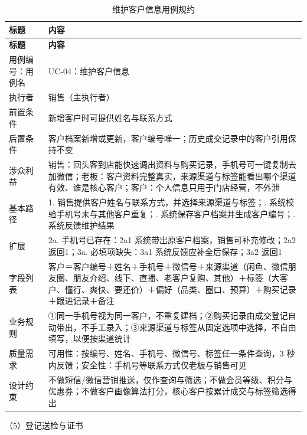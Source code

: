 {\small
\begin{longtable}{@{}L{3.0cm} L{12.3cm}@{}}
\caption{维护客户信息用例规约}\label{tab:uc-04}\\
\toprule
\textbf{标题} & \textbf{内容} \\
\midrule
\endfirsthead
\toprule
\textbf{标题} & \textbf{内容} \\
\midrule
\endhead
用例编号：用例名 & UC-04：维护客户信息 \\
\midrule
执行者 & 销售（主执行者） \\
\midrule
前置条件 & 新增客户时可提供姓名与联系方式 \\
\midrule
后置条件 & 客户档案新增或更新，客户编号唯一；历史成交记录中的客户引用保持不变 \\
\midrule
涉众利益 & 销售：回头客到店能快速调出资料与购买记录，手机号可一键复制去加微信；\newline 老板：客户资料完整真实，来源渠道与标签能看出哪个渠道有效、谁是核心客户；\newline 客户：个人信息只用于门店经营，不外泄 \\
\midrule
基本路径 & 1. 销售提供客户姓名与联系方式，并选择来源渠道与标签；. 系统校验手机号未与其他客户重复；. 系统保存客户档案并生成客户编号；. 系统反馈维护结果 \\
\midrule
扩展 & 2a. 手机号已存在：2a1 系统带出原客户档案，销售可补充修改；2a2 返回1；\newline 3a. 必填项缺失：3a1 系统反馈应补全后保存；3a2 返回1 \\
\midrule
字段列表 & 客户＝客户编号＋姓名＋手机号＋微信号＋来源渠道（闲鱼、微信朋友圈、朋友介绍、线下、直播、老客户复购、其他）＋标签（大客户、懂行、爽快、要还价）＋偏好（品类、圈口、预算）＋购买记录＋跟进记录＋备注 \\
\midrule
业务规则 & ①同一手机号视为同一客户，不重复建档；\newline ②购买记录由成交登记自动带出，不手工录入；\newline ③来源渠道与标签从固定选项中选择，不自由填写，以便按渠道统计 \\
\midrule
质量需求 & 可用性：按编号、姓名、手机号、微信号、标签任一条件查询，3 秒内反馈；\newline 安全性：手机号等联系方式仅老板与销售可见 \\
\midrule
设计约束 & 不做短信/微信营销推送，仅作查询与筛选；不做会员等级、积分与优惠券；不做客户画像算法打分，核心客户按累计成交与标签筛选得出 \\
\midrule
\bottomrule
\end{longtable}}
\noindent（5）登记送检与证书

